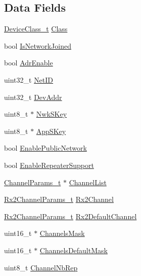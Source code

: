 \subsection*{Data Fields}
\begin{DoxyCompactItemize}
\item 
\hyperlink{group__LORAMAC_ga29dc2e097802faaf8fbd0e18ff99695f}{Device\+Class\+\_\+t} \hyperlink{unionuMibParam_a0a7f108faca608d6271ed070b3666dad}{Class}
\item 
bool \hyperlink{unionuMibParam_a2f94965111a263fa6808260203c020f8}{Is\+Network\+Joined}
\item 
bool \hyperlink{unionuMibParam_ab178fe02b29604d3996b55e72ebc39b6}{Adr\+Enable}
\item 
uint32\+\_\+t \hyperlink{unionuMibParam_a28a692f38f8742b309d7973648a6d612}{Net\+ID}
\item 
uint32\+\_\+t \hyperlink{unionuMibParam_a41a1aedea4cb10b45ddf9b8ebd1fdf54}{Dev\+Addr}
\item 
uint8\+\_\+t $\ast$ \hyperlink{unionuMibParam_a64c3f5e98c8558eedbd7fe42dfcd160e}{Nwk\+S\+Key}
\item 
uint8\+\_\+t $\ast$ \hyperlink{unionuMibParam_aa457344123276ddc04277da5208175ed}{App\+S\+Key}
\item 
bool \hyperlink{unionuMibParam_af926413a7ecbe5fcf8b223fff46ad8e2}{Enable\+Public\+Network}
\item 
bool \hyperlink{unionuMibParam_a9bf9eee9867513c64e39300c2c13c981}{Enable\+Repeater\+Support}
\item 
\hyperlink{group__LORAMAC_ga1360ca6f82c6d125ea43a9dad9b56184}{Channel\+Params\+\_\+t} $\ast$ \hyperlink{unionuMibParam_af3b0b4ded686920d7494d6ea0ec80700}{Channel\+List}
\item 
\hyperlink{group__LORAMAC_ga8f57f29481ea92c24f6af04b96a95e0f}{Rx2\+Channel\+Params\+\_\+t} \hyperlink{unionuMibParam_af2e450398d3e72d7dc9d95fc54e1574e}{Rx2\+Channel}
\item 
\hyperlink{group__LORAMAC_ga8f57f29481ea92c24f6af04b96a95e0f}{Rx2\+Channel\+Params\+\_\+t} \hyperlink{unionuMibParam_a9f0e695c27a48c27895fadc99813eb44}{Rx2\+Default\+Channel}
\item 
uint16\+\_\+t $\ast$ \hyperlink{unionuMibParam_af7353a35521c6aa58ffee90589a98620}{Channels\+Mask}
\item 
uint16\+\_\+t $\ast$ \hyperlink{unionuMibParam_a5d650a767189429f903b22e785e0d4b0}{Channels\+Default\+Mask}
\item 
uint8\+\_\+t \hyperlink{unionuMibParam_ac25048296416e1ca348d568d539ed946}{Channel\+Nb\+Rep}

\end{DoxyCompactItemize}
